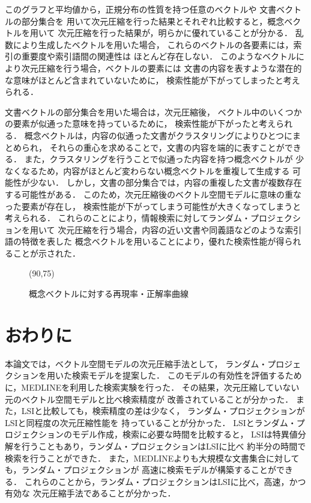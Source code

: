 このグラフと平均値から，正規分布の性質を持つ任意のベクトルや
文書ベクトルの部分集合を
用いて次元圧縮を行った結果とそれぞれ比較すると，概念ベクトルを用いて
次元圧縮を行った結果が，明らかに優れていることが分かる．
乱数により生成したベクトルを用いた場合，
これらのベクトルの各要素には，索引の重要度や索引語間の関連性は
ほとんど存在しない．
このようなベクトルにより次元圧縮を行う場合，ベクトルの要素には
文書の内容を表すような潜在的な意味がほとんど含まれていないために，
検索性能が下がってしまったと考えられる．

文書ベクトルの部分集合を用いた場合は，次元圧縮後，
ベクトル中のいくつかの要素が似通った意味を持っているために，
検索性能が下がったと考えられる．
概念ベクトルは，内容の似通った文書がクラスタリングによりひとつにまとめられ，
それらの重心を求めることで，文書の内容を端的に表すことができる．
また，クラスタリングを行うことで似通った内容を持つ概念ベクトルが
少なくなるため，内容がほとんど変わらない概念ベクトルを重複して生成する
可能性が少ない．
しかし，文書の部分集合では，内容の重複した文書が複数存在する可能性がある．
このため，次元圧縮後のベクトル空間モデルに意味の重なった要素が存在し，
検索性能が下がってしまう可能性が大きくなってしまうと考えられる．
これらのことにより，情報検索に対してランダム・プロジェクションを用いて
次元圧縮を行う場合，内容の近い文書や同義語などのような索引語の特徴を表した
概念ベクトルを用いることにより，優れた検索性能が得られることが示された．
\begin{figure}[tb]
	\begin{center}
                 \atari(90,75)
		
	\end{center}
	\caption{概念ベクトルに対する再現率・正解率曲線}
	\label{concept}
\end{figure}

\section{おわりに}
本論文では，ベクトル空間モデルの次元圧縮手法として，
ランダム・プロジェクションを用いた検索モデルを提案した．
このモデルの有効性を評価するために，MEDLINEを利用した検索実験を行った．
その結果，次元圧縮していない元のベクトル空間モデルと比べ検索精度が
改善されていることが分かった．
また，LSIと比較しても，検索精度の差は少なく，
ランダム・プロジェクションがLSIと同程度の次元圧縮性能を
持っていることが分かった．
LSIとランダム・プロジェクションのモデル作成，検索に必要な時間を比較すると，
LSIは特異値分解を行うこともあり，ランダム・プロジェクションはLSIに比べ
約半分の時間で検索を行うことができた．
また，MEDLINEよりも大規模な文書集合に対しても，ランダム・プロジェクションが
高速に検索モデルが構築することができる．
これらのことから，ランダム・プロジェクションはLSIに比べ，高速，かつ有効な
次元圧縮手法であることが分かった．

